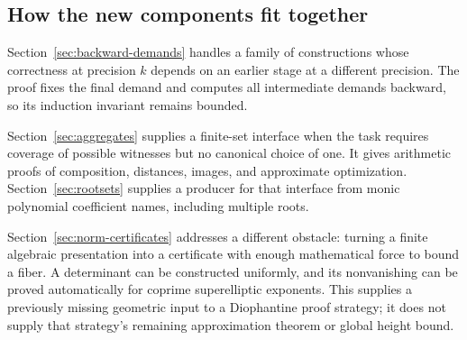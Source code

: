 \subsection{How the new components fit together}

Section~\ref{sec:backward-demands} handles a family of constructions whose
correctness at precision $k$ depends on an earlier stage at a different
precision. The proof fixes the final demand and computes all intermediate
demands backward, so its induction invariant remains bounded.

Section~\ref{sec:aggregates} supplies a finite-set interface when the task
requires coverage of possible witnesses but no canonical choice of one.
It gives arithmetic proofs of composition, distances, images, and
approximate optimization. Section~\ref{sec:rootsets} supplies a producer
for that interface from monic polynomial coefficient names, including
multiple roots.

Section~\ref{sec:norm-certificates} addresses a different obstacle:
turning a finite algebraic presentation into a certificate with enough
mathematical force to bound a fiber. A determinant can be constructed
uniformly, and its nonvanishing can be proved automatically for coprime
superelliptic exponents. This supplies a previously missing geometric
input to a Diophantine proof strategy; it does not supply that strategy's
remaining approximation theorem or global height bound.
